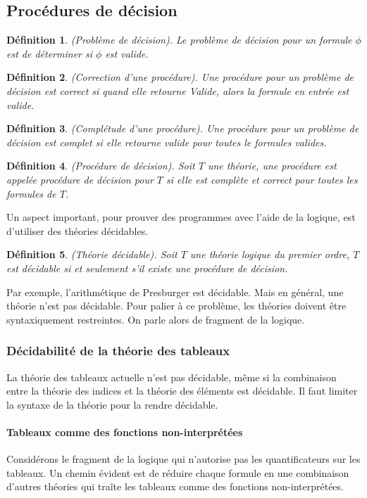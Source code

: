 \documentclass[11pt,openany]{article}
\newtheorem{definition}{D\'efinition}[subsection]
\begin{document}
 	\subsection{Proc\'edures de d\'ecision}
 	\begin{definition}
 	(Probl\`eme de d\'ecision). Le probl\`eme de d\'ecision pour un formule $\phi$ est de d\'eterminer si $\phi$ est valide.
 	\end{definition}
 	\begin{definition}
 	(Correction d'une proc\'edure). Une proc\'edure pour un probl\`eme de d\'ecision est correct si quand elle retourne \textit{Valide}, alors la formule en entr\'ee est valide.
 	\end{definition}
 	\begin{definition}
 		(Compl\'etude d'une proc\'edure). Une proc\'edure pour un probl\`eme de d\'ecision est complet si elle retourne valide pour toutes le formules valides.
 	\end{definition}
 	\begin{definition}
 	(Proc\'edure de d\'ecision). Soit $T$ une th\'eorie, une proc\'edure est appel\'ee \textit{proc\'edure de d\'ecision pour $T$} si elle est compl\`ete et correct pour toutes les formules de $T$. 
 	\end{definition} 	
 	Un aspect important, pour prouver des programmes avec l'aide de la logique, est d'utiliser des th\'eories d\'ecidables.
	\begin{definition}
	(Th\'eorie d\'ecidable). Soit $T$ une th\'eorie logique du premier ordre, $T$ est d\'ecidable si et seulement s'il existe une proc\'edure de d\'ecision.
	\end{definition}
	Par exemple, l'arithm\'etique de Presburger est d\'ecidable. Mais en g\'en\'eral, une th\'eorie n'est pas d\'ecidable. Pour palier \`a ce probl\`eme, les th\'eories doivent \^etre syntaxiquement restreintes. On parle alors de fragment de la logique.
			
	\subsubsection{D\'ecidabilit\'e de la th\'eorie des tableaux}
			
	La th\'eorie des tableaux actuelle n'est pas d\'ecidable, m\^eme si la combinaison entre la th\'eorie des indices et la th\'eorie des \'el\'ements est d\'ecidable. Il faut limiter la syntaxe de la th\'eorie pour la rendre d\'ecidable.
	\paragraph{Tableaux comme des fonctions non-interpr\'et\'ees}
	Consid\'erons le fragment de la logique qui n'autorise pas les quantificateurs sur les tableaux. Un chemin \'evident est de r\'eduire chaque formule en une combinaison d'autres th\'eories qui tra\^ite les tableaux comme des fonctions non-interpr\'et\'ees.
	
\end{document}
